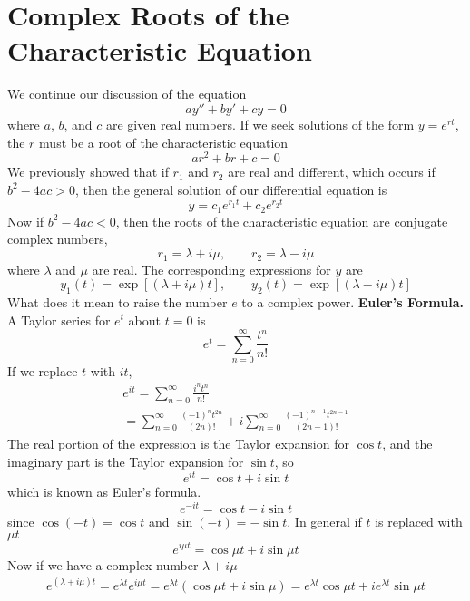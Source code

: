 \section{Complex Roots of the Characteristic Equation}
    We continue our discussion of the equation
    \begin{equation*}
        ay'' + by' + cy = 0
    \end{equation*}
    where $a$, $b$, and $c$ are given real numbers. If we seek solutions of the form $y = e^{rt}$, the $r$ must be a root of the characteristic equation
    \begin{equation*}
        ar^2 + br + c = 0
    \end{equation*}
    We previously showed that if $r_1$ and $r_2$ are real and different, which occurs if $b^2 - 4ac > 0$, then the general solution of our differential equation is
    \begin{equation*}
        y = c_1e^{r_1t} + c_2e^{r_2t}
    \end{equation*}
    Now if $b^2 - 4ac < 0$, then the roots of the characteristic equation are conjugate complex numbers,
    $$r_1 = \lambda + i\mu, \qquad r_2 = \lambda - i\mu$$
    where $\lambda$ and $\mu$ are real. The corresponding expressions for $y$ are
    $$y_1(t) = \exp[(\lambda + i\mu)t], \qquad y_2(t) = \exp[(\lambda - i\mu)t]$$
    What does it mean to raise the number $e$ to a complex power.
    \textbf{Euler's Formula.} A Taylor series for $e^t$ about $t=0$ is
    $$e^t = \sum_{n=0}^\infty \frac{t^n}{n!}$$
    If we replace $t$ with $it$,
    \begin{align*}
        e^{it} = \sum_{n=0}^\infty \frac{i^nt^n}{n!} \\
        = \sum_{n=0}^\infty \frac{(-1)^nt^{2n}}{(2n)!} + i\sum_{n=0}^\infty \frac{(-1)^{n-1}t^{2n-1}}{(2n-1)!}
    \end{align*}
    The real portion of the expression is the Taylor expansion for $\cos t$, and the imaginary part is the Taylor expansion for $\sin t$, so
    $$e^{it} = \cos t + i\sin t$$
    which is known as Euler's formula.
    $$e^{-it} = \cos t - i\sin t$$
    since $\cos(-t) = \cos t$ and $\sin(-t) = -\sin t$. In general if $t$ is replaced with $\mu t$
    $$e^{i\mu t} = \cos \mu t + i\sin \mu t$$
    Now if we have a complex number $\lambda + i\mu$
    \begin{align*}
        e^{(\lambda + i\mu)t} = e^{\lambda t}e^{i\mu t}
        = e^{\lambda t}(\cos \mu t + i\sin \mu)
        = e^{\lambda t}\cos \mu t + ie^{\lambda t}\sin \mu t
    \end{align*}
